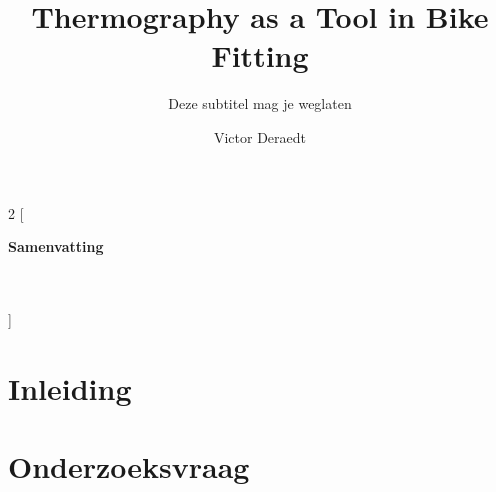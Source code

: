 \documentclass[ti,a4paper,11pt,twoside,openright]{uantwerpenbamathesis}
\title{Thermography as a Tool in Bike Fitting} %
\subtitle{Deze subtitel mag je weglaten}
\author{Victor Deraedt}
\begin{document}
\maketitle

\frontmatter

\tableofcontents

\mainmatter

\pagestyle{empty}
\thispagestyle{empty}
\begin{multicols}{2}
  [
  \begin{center}
    \textbf{
      \Large Samenvatting\\[1ex]
      \@title~\\[1ex]
      \large \@subtitle\\[0.5ex]}
    \@author
  \end{center}
  ]

  \kant[11]

  \kant[12]

  \kant [13]

  \kant [14]

  \kant [15]

\end{multicols}
\pagestyle{fancy}


\chapter{Inleiding}


\kant[1]

\chapter{Onderzoeksvraag}
\end{document}

